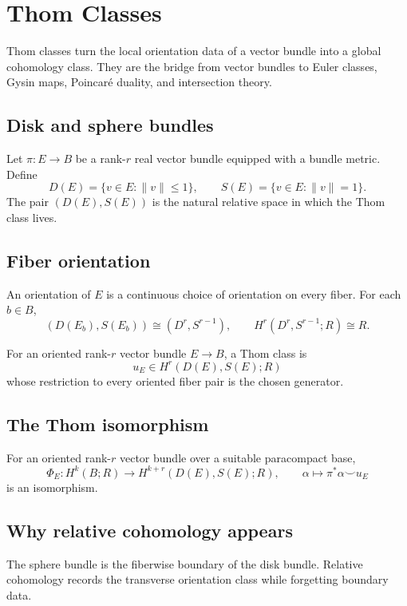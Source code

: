 
\chapter{Thom Classes}
\label{ch:viii31-thom-classes}

Thom classes turn the local orientation data of a vector bundle into a global
cohomology class.  They are the bridge from vector bundles to Euler classes,
Gysin maps, Poincaré duality, and intersection theory.

\section{Disk and sphere bundles}
Let $\pi:E\to B$ be a rank-$r$ real vector bundle equipped with a bundle
metric. Define
\[
D(E)=\{v\in E:\|v\|\le1\},\qquad S(E)=\{v\in E:\|v\|=1\}.
\]
The pair $(D(E),S(E))$ is the natural relative space in which the Thom class
lives.

\section{Fiber orientation}
An orientation of $E$ is a continuous choice of orientation on every fiber.
For each $b\in B$,
\[
(D(E_b),S(E_b))\cong(D^r,S^{r-1}),\qquad
H^r(D^r,S^{r-1};R)\cong R.
\]

\begin{definition}
\label{def:viii31-thom-class}
For an oriented rank-$r$ vector bundle $E\to B$, a Thom class is
\[
u_E\in H^r(D(E),S(E);R)
\]
whose restriction to every oriented fiber pair is the chosen generator.
\end{definition}

\section{The Thom isomorphism}
\begin{theorem}
\label{thm:viii31-thom-isomorphism}
For an oriented rank-$r$ vector bundle over a suitable paracompact base,
\[
\Phi_E:H^k(B;R)\longrightarrow H^{k+r}(D(E),S(E);R),
\qquad
\alpha\longmapsto \pi^*\alpha\smile u_E
\]
is an isomorphism.
\end{theorem}

\section{Why relative cohomology appears}
The sphere bundle is the fiberwise boundary of the disk bundle.  Relative
cohomology records the transverse orientation class while forgetting boundary
data.

